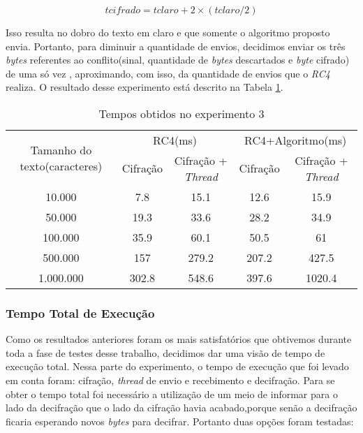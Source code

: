 \begin{equation}
	tcifrado = tclaro + 2 \times (tclaro/2)
\end{equation}

Isso resulta no dobro do texto em claro e que somente o algoritmo proposto envia. Portanto, para diminuir a quantidade de envios, decidimos enviar os três \textit{bytes} referentes ao conflito(sinal, quantidade de \textit{bytes} descartados e \textit{byte} cifrado) de uma só vez , aproximando, com isso, da quantidade de envios que o \textit{RC4} realiza. O resultado desse experimento está descrito na Tabela \ref{results-experiment-3}.

\begin{table}[h]
\centering
\begin{tabular}{ c c c c c }
\toprule
\multirow{2}{3cm}{Tamanho do texto(caracteres)} & \multicolumn{2}{c}{RC4(ms)}         & \multicolumn{2}{c}{RC4+Algoritmo(ms)} \\ %
                                              & Cifração & Cifração + \textit{Thread} & Cifração  & Cifração + \textit{Thread}   \\ \hline
10.000                                        & 7.8      & 15.1                  & 12.6      & 15.9                   \\ \hline
50.000                                        & 19.3     & 33.6                  & 28.2      & 34.9                   \\ \hline
100.000                                       & 35.9     & 60.1                  & 50.5      & 61                     \\ \hline
500.000                                       & 157      & 279.2                 & 207.2     & 427.5                  \\ \hline
1.000.000                                     & 302.8    & 548.6                 & 397.6     & 1020.4                 \\ \hline
\end{tabular}
\caption{Tempos obtidos no experimento 3}
\label{results-experiment-3}
\end{table}

\subsubsection{Tempo Total de Execução}

Como os resultados anteriores foram os mais satisfatórios que obtivemos durante toda a fase de testes desse trabalho, decidimos dar uma visão de tempo de execução total. Nessa parte do experimento, o tempo de execução que foi levado em conta foram: cifração, \textit{thread} de envio e recebimento e decifração. Para se obter o tempo total foi necessário a utilização de um meio de informar para o lado da decifração que o lado da cifração havia acabado,porque senão a decifração ficaria esperando novos \textit{bytes} para decifrar. Portanto duas opções foram testadas:


